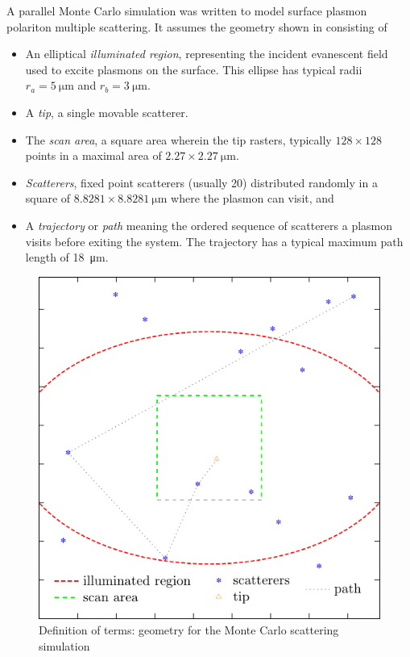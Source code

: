 A parallel Monte Carlo simulation was written to model surface plasmon
polariton multiple scattering.
It assumes the geometry shown in  consisting of
\begin{itemize}
  \item An elliptical \textit{illuminated region}, representing the incident evanescent
        field used to excite plasmons on the surface.  This ellipse has
        typical radii $r_a=\SI{5}{\micro\meter}$ and $r_b=\SI{3}{\micro\meter}$.
  \item A \textit{tip}, a single movable scatterer.
  \item The \textit{scan area}, a square area wherein the tip rasters, typically
        $128\times128$ points in a maximal area of $2.27\times\SI{2.27}{\micro\meter}$.
  \item \textit{Scatterers}, fixed point scatterers (usually \num{20})
        distributed randomly in a square of $8.8281\times\SI{8.8281}{\micro\meter}$
        where the plasmon can visit, and
  \item A \textit{trajectory} or \textit{path} meaning the ordered sequence of scatterers a
        plasmon visits before exiting the system.  The trajectory has a typical maximum
        path length of \SI{18}{\micro\meter}.
\end{itemize}
\begin{figure}[ht]
  \centering
  \includegraphics[keepaspectratio]{scatteringmicro/figures/montecarlogeo.pdf}
  \caption{Definition of terms: geometry for the Monte Carlo scattering
    simulation}
  \label{fig:plasmongeo}
\end{figure}

